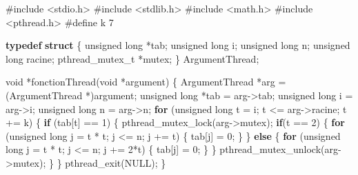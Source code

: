 \documentclass[
]{article}
\newenvironment{Shaded}{}{}
\newcommand{\ControlFlowTok}[1]{\textcolor[rgb]{0.00,0.44,0.13}{\textbf{#1}}}
\newcommand{\DataTypeTok}[1]{\textcolor[rgb]{0.56,0.13,0.00}{#1}}
\newcommand{\DecValTok}[1]{\textcolor[rgb]{0.25,0.63,0.44}{#1}}
\newcommand{\ImportTok}[1]{#1}
\newcommand{\KeywordTok}[1]{\textcolor[rgb]{0.00,0.44,0.13}{\textbf{#1}}}
\newcommand{\NormalTok}[1]{#1}
\newcommand{\PreprocessorTok}[1]{\textcolor[rgb]{0.74,0.48,0.00}{#1}}
\begin{document}
\begin{Shaded}
\begin{Highlighting}[]
\PreprocessorTok{\#include }\ImportTok{\textless{}stdio.h\textgreater{}}
\PreprocessorTok{\#include }\ImportTok{\textless{}stdlib.h\textgreater{}}
\PreprocessorTok{\#include }\ImportTok{\textless{}math.h\textgreater{}}
\PreprocessorTok{\#include }\ImportTok{\textless{}pthread.h\textgreater{}}
\PreprocessorTok{\#define k 7}

\KeywordTok{typedef} \KeywordTok{struct}
\NormalTok{\{}
    \DataTypeTok{unsigned} \DataTypeTok{long}\NormalTok{ *tab;}
    \DataTypeTok{unsigned} \DataTypeTok{long}\NormalTok{ i;}
    \DataTypeTok{unsigned} \DataTypeTok{long}\NormalTok{ n;}
    \DataTypeTok{unsigned} \DataTypeTok{long}\NormalTok{ racine;}
\NormalTok{    pthread\_mutex\_t *mutex;}
\NormalTok{\} ArgumentThread;}

\DataTypeTok{void}\NormalTok{ *fonctionThread(}\DataTypeTok{void}\NormalTok{ *argument)}
\NormalTok{\{}
\NormalTok{    ArgumentThread *arg = (ArgumentThread *)argument;}
    \DataTypeTok{unsigned} \DataTypeTok{long}\NormalTok{ *tab = arg{-}\textgreater{}tab;}
    \DataTypeTok{unsigned} \DataTypeTok{long}\NormalTok{ i = arg{-}\textgreater{}i;}
    \DataTypeTok{unsigned} \DataTypeTok{long}\NormalTok{ n = arg{-}\textgreater{}n;}
    \ControlFlowTok{for}\NormalTok{ (}\DataTypeTok{unsigned} \DataTypeTok{long}\NormalTok{ t = i; t \textless{}= arg{-}\textgreater{}racine; t += k)}
\NormalTok{    \{}
        \ControlFlowTok{if}\NormalTok{ (tab[t] == }\DecValTok{1}\NormalTok{)}
\NormalTok{        \{}
\NormalTok{            pthread\_mutex\_lock(arg{-}\textgreater{}mutex);}
            \ControlFlowTok{if}\NormalTok{(t == }\DecValTok{2}\NormalTok{)}
\NormalTok{            \{}
                \ControlFlowTok{for}\NormalTok{ (}\DataTypeTok{unsigned} \DataTypeTok{long}\NormalTok{ j = t * t; j \textless{}= n; j += t)}
\NormalTok{                \{}
\NormalTok{                    tab[j] = }\DecValTok{0}\NormalTok{;}
\NormalTok{                \}}
\NormalTok{            \}}
            \ControlFlowTok{else}
\NormalTok{            \{}
                \ControlFlowTok{for}\NormalTok{ (}\DataTypeTok{unsigned} \DataTypeTok{long}\NormalTok{ j = t * t; j \textless{}= n; j += }\DecValTok{2}\NormalTok{*t)}
\NormalTok{                \{}
\NormalTok{                    tab[j] = }\DecValTok{0}\NormalTok{;}
\NormalTok{                \}}
\NormalTok{            \}}
\NormalTok{            pthread\_mutex\_unlock(arg{-}\textgreater{}mutex);}
\NormalTok{        \}}
\NormalTok{    \}}
\NormalTok{    pthread\_exit(NULL);}
\NormalTok{\}}


\end{Highlighting}
\end{Shaded}
\end{document}
